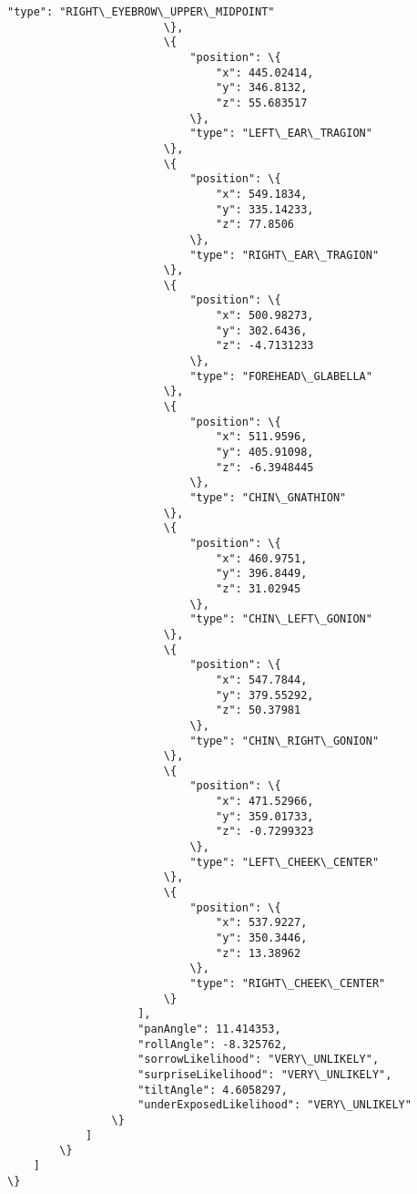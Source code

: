 \documentclass[11pt]{article}
\begin{document}
\begin{Verbatim}[commandchars=\\\{\}]
                            "type": "RIGHT\_EYEBROW\_UPPER\_MIDPOINT"
                        \},
                        \{
                            "position": \{
                                "x": 445.02414,
                                "y": 346.8132,
                                "z": 55.683517
                            \},
                            "type": "LEFT\_EAR\_TRAGION"
                        \},
                        \{
                            "position": \{
                                "x": 549.1834,
                                "y": 335.14233,
                                "z": 77.8506
                            \},
                            "type": "RIGHT\_EAR\_TRAGION"
                        \},
                        \{
                            "position": \{
                                "x": 500.98273,
                                "y": 302.6436,
                                "z": -4.7131233
                            \},
                            "type": "FOREHEAD\_GLABELLA"
                        \},
                        \{
                            "position": \{
                                "x": 511.9596,
                                "y": 405.91098,
                                "z": -6.3948445
                            \},
                            "type": "CHIN\_GNATHION"
                        \},
                        \{
                            "position": \{
                                "x": 460.9751,
                                "y": 396.8449,
                                "z": 31.02945
                            \},
                            "type": "CHIN\_LEFT\_GONION"
                        \},
                        \{
                            "position": \{
                                "x": 547.7844,
                                "y": 379.55292,
                                "z": 50.37981
                            \},
                            "type": "CHIN\_RIGHT\_GONION"
                        \},
                        \{
                            "position": \{
                                "x": 471.52966,
                                "y": 359.01733,
                                "z": -0.7299323
                            \},
                            "type": "LEFT\_CHEEK\_CENTER"
                        \},
                        \{
                            "position": \{
                                "x": 537.9227,
                                "y": 350.3446,
                                "z": 13.38962
                            \},
                            "type": "RIGHT\_CHEEK\_CENTER"
                        \}
                    ],
                    "panAngle": 11.414353,
                    "rollAngle": -8.325762,
                    "sorrowLikelihood": "VERY\_UNLIKELY",
                    "surpriseLikelihood": "VERY\_UNLIKELY",
                    "tiltAngle": 4.6058297,
                    "underExposedLikelihood": "VERY\_UNLIKELY"
                \}
            ]
        \}
    ]
\}
    \end{Verbatim}
\end{document}
